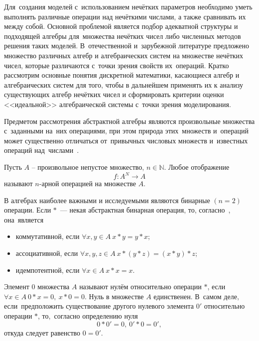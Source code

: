 Для~создания моделей с~использованием нечётких параметров необходимо уметь выполнять различные операции над нечёткими числами, а также сравнивать их между собой. Основной проблемой является подбор адекватной структуры и подходящей алгебры для~множества нечётких чисел либо численных методов решения таких моделей. В~отечественной и~зарубежной литературе предложено множество различных алгебр и алгебраических систем на множестве нечётких чисел, которые различаются с~точки зрения свойств их~операций. Кратко рассмотрим основные понятия дискретной математики, касающиеся алгебр и алгебраических систем для того, чтобы в дальнейшем применять их к анализу существующих алгебр нечётких чисел и сформировать критерии оценки <<идеальной>> алгебраической системы с~точки зрения моделирования.

Предметом рассмотрения абстрактной алгебры являются произвольные множества с~заданными на~них операциями, при этом природа этих~множеств и~операций может существенно отличаться от~привычных числовых множеств и~известных операций над~числами~\cite{Bauman_DM}.

\begin{mydef}
Пусть $A$ – произвольное непустое множество, $n\in \mathbb{N}$. Любое отображение 
\begin{equation*}
	f:A^N \to A
\end{equation*}
называют $n$-арной операцией на множестве $A$.
\end{mydef}

В алгебрах наиболее важными и исследуемыми являются бинарные $\left( n=2 \right)$ операции. Если $*$~--- некая абстрактная бинарная операция, то, согласно~\cite{Bauman_DM}, она~является
\begin{itemize}
	\item коммутативной, если $\forall x,y\in A\ x*y=y*x$;
	\item ассоциативной, если $\forall x,y,z\in A\ x*\left( y*z \right)=\left( x*y \right)*z$;
	\item идемпотентной, если $\forall x\in A\ x*x=x$.
\end{itemize}

Элемент $0$ множества $A$ называют нулём относительно операции $*$, если $\forall x\in A\ 0*x=0,\ x*0=0$. Нуль в множестве $A$ единственен. В~самом деле, если~предположить существование другого нулевого элемента ${0}'$ относительно операции $*$, то,~согласно определению нуля
\begin{equation*}
	0*{0}'=0,\ {0}'*0={0}',
\end{equation*}
откуда следует равенство $0={0}'$.


